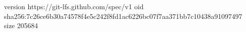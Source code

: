 version https://git-lfs.github.com/spec/v1
oid sha256:7c26ce6b30a74578f4e5c242f8fd1ac6226bc07f7aa371bb7c10438a91097497
size 205684
